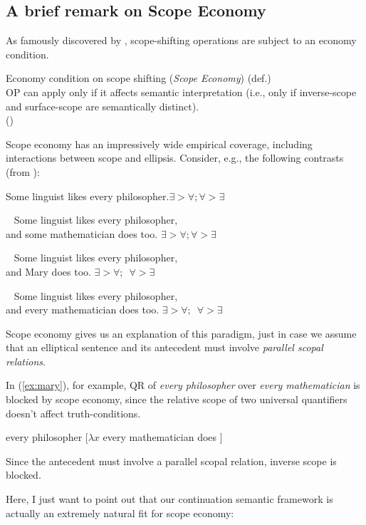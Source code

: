 \documentclass[nols,twoside,nofonts,nobib,nohyper]{tufte-handout}
\begin{document}
\subsection{A brief remark on Scope Economy}

As famously discovered by \cite{fox1995}, scope-shifting operations are subject
to an economy condition.

\ex
Economy condition on scope shifting (\textit{Scope Economy}) (def.)\\
OP can apply only if it affects semantic interpretation (i.e., only if
inverse-scope and surface-scope are semantically distinct).\\
\phantom{,}\hfill(\citealt[p.,21]{fox2000})
\xe

Scope economy has an impressively wide empirical coverage, including
interactions between scope and ellipsis. Consider, e.g., the following contrasts
(from \citealt{fox1995}):

\ex
Some linguist likes every philosopher.\hfill $∃ > ∀; ∀ > ∃$
\xe

\ex~
Some linguist likes every philosopher,\\
and some mathematician does too.\hfill
$∃ > ∀; ∀ > ∃$
\xe

\ex~
Some linguist likes every philosopher,\\
and Mary does too.\hfill
$∃ > ∀; $\xmark $∀ > ∃$
\xe

\ex~
Some linguist likes every philosopher,\\
and every mathematician does too.\hfill
$∃ > ∀; $\xmark $∀ > ∃$\label{ex:mary}
\xe

Scope economy gives us an explanation of this paradigm, just in case we assume
that an elliptical sentence and its antecedent must involve \textit{parallel
  scopal relations}.

In (\ref{ex:mary}), for example, QR of \textit{every philosopher} over \textit{every
  mathematician} is blocked by scope economy, since the relative scope of two
universal quantifiers doesn't affect truth-conditions.

\ex
\ljudge{*}every philosopher [$λ x$ every mathematician does ]
\xe

Since the antecedent must involve a parallel scopal relation, inverse scope is blocked.

Here, I just want to point out that our continuation semantic framework is
actually an extremely natural fit for scope economy:
\end{document}
